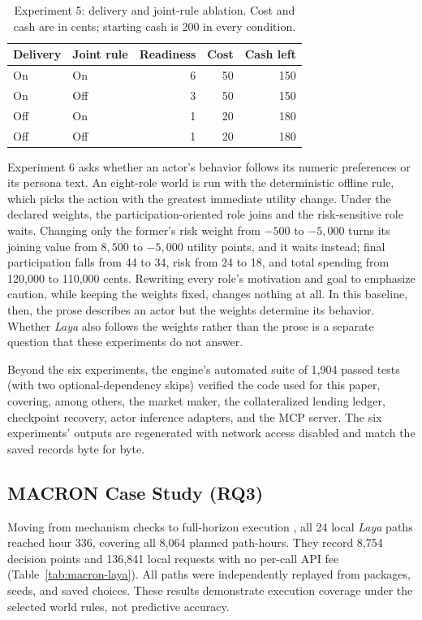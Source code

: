 \begin{table}[t]
\caption{Experiment 5: delivery and joint-rule ablation. Cost and cash are in
cents; starting cash is 200 in every condition.}
\label{tab:ablation}
\centering\footnotesize
\begin{tabular}{@{}llrrr@{}}
\toprule Delivery & Joint rule & Readiness & Cost & Cash left \\
\midrule
On & On & 6 & 50 & 150 \\
On & Off & 3 & 50 & 150 \\
Off & On & 1 & 20 & 180 \\
Off & Off & 1 & 20 & 180 \\
\bottomrule
\end{tabular}
\end{table}

Experiment 6 asks whether an actor's behavior follows its numeric
preferences or its persona text. An eight-role world is run with the
deterministic offline rule, which picks the action with the greatest
immediate utility change. Under the declared weights, the
participation-oriented role joins and the risk-sensitive role waits. Changing
only the former's risk weight from $-500$ to $-5{,}000$ turns its joining
value from $8{,}500$ to $-5{,}000$ utility points, and it waits instead; final
participation falls from 44 to 34, risk from 24 to 18, and total spending from
120{,}000 to 110{,}000 cents. Rewriting every role's motivation and goal to
emphasize caution, while keeping the weights fixed, changes nothing at all.
In this baseline, then, the prose describes an actor but the weights
determine its behavior. Whether \textit{Laya} also follows the
weights rather than the prose is a separate question that these experiments
do not answer.

Beyond the six experiments, the engine's automated suite of 1{,}904 passed
tests (with two optional-dependency skips) verified the code used for this
paper, covering, among others, the market maker, the collateralized
lending ledger, checkpoint recovery, actor inference adapters, and the MCP server. The six experiments' outputs are regenerated with network
access disabled and match the saved records byte for byte.

\subsection{MACRON Case Study (RQ3)}\label{sec:res-macron}
Moving from mechanism checks to full-horizon execution , all 24 local
\textit{Laya} paths reached hour 336, covering all 8{,}064 planned path-hours.
They record 8{,}754 decision points and 136{,}841 local  requests with no per-call
API fee (Table~\ref{tab:macron-laya}). All paths were independently replayed
from packages, seeds, and saved choices. These results demonstrate execution
coverage under the selected world rules, not predictive accuracy.

